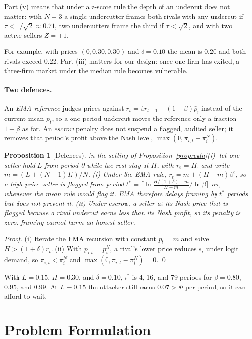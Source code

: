 \documentclass{article}
\newtheorem{proposition}{Proposition}
\begin{document}
Part (v) means that under a z-score rule the depth of an undercut does not matter: with $N=3$ a single undercutter frames both rivals with any undercut if $\tau<1/\sqrt2\approx0.71$, two undercutters frame the third if $\tau<\sqrt2$, and with two active sellers $Z=\pm1$.

For example, with prices $(0,0.30,0.30)$ and $\delta=0.10$ the mean is $0.20$ and both rivals exceed $0.22$. Part (iii) matters for our design: once one firm has exited, a three-firm market under the median rule becomes vulnerable.

\paragraph{Two defences.} An \emph{EMA reference} judges prices against $r_t=\beta r_{t-1}+(1-\beta)\bar p_t$ instead of the current mean $\bar p_t$, so a one-period undercut moves the reference only a fraction $1-\beta$ as far. An \emph{escrow} penalty does not suspend a flagged, audited seller; it removes that period's profit above the Nash level, $\max(0,\pi_{i,t}-\pi^N_i)$.

\begin{proposition}[Defences]\label{prop:def}
In the setting of Proposition~\ref{prop:vuln}(i), let one seller hold $L$ from period 0 while the rest stay at $H$, with $r_0=H$, and write $m=(L+(N-1)H)/N$. (i) Under the EMA rule, $r_t=m+(H-m)\beta^t$, so a high-price seller is flagged from period $t^\ast=\big\lceil \ln\!\frac{H/(1+\delta)-m}{H-m}\big/\ln\beta\big\rceil$ on, whenever the mean rule would flag it. EMA therefore delays framing by $t^\ast$ periods but does not prevent it. (ii) Under escrow, a seller at its Nash price that is flagged because a rival undercut earns less than its Nash profit, so its penalty is zero: framing cannot harm an honest seller.
\end{proposition}
\emph{Proof.} (i) Iterate the EMA recursion with constant $\bar p_t=m$ and solve $H>(1+\delta)r_t$. (ii) With $p_{i,t}=p^N_i$, a rival's lower price reduces $s_i$ under logit demand, so $\pi_{i,t}<\pi^N_i$ and $\max(0,\pi_{i,t}-\pi^N_i)=0$. \qed

With $L=0.15$, $H=0.30$, and $\delta=0.10$, $t^\ast$ is 4, 16, and 79 periods for $\beta=0.80$, $0.95$, and $0.99$. At $L=0.15$ the attacker still earns $0.07>\Phi$ per period, so it can afford to wait.

\section{Problem Formulation}
\label{sec:formulation}
\end{document}
